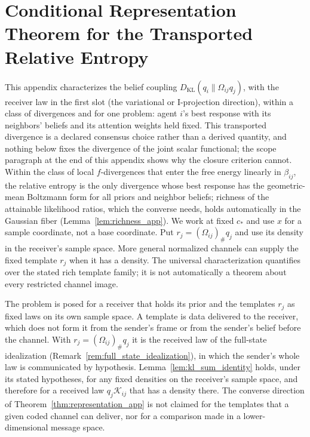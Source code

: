 \section{Conditional Representation Theorem for the Transported Relative Entropy}
\label{app:conditional_representation}

This appendix characterizes the belief coupling $D_{\mathrm{KL}}(q_i\|\Omega_{ij}q_j)$, with the receiver law in the first slot (the variational or I-projection direction), within a class of divergences and for one problem: agent $i$'s best response with its neighbors' beliefs and its attention weights held fixed. This transported divergence is a declared consensus choice rather than a derived quantity, and nothing below fixes the divergence of the joint scalar functional; the scope paragraph at the end of this appendix shows why the closure criterion cannot. Within the class of local $f$-divergences that enter the free energy linearly in $\beta_{ij}$, the relative entropy is the only divergence whose best response has the geometric-mean Boltzmann form for all priors and neighbor beliefs; richness of the attainable likelihood ratios, which the converse needs, holds automatically in the Gaussian fiber (Lemma~\ref{lem:richness_app}). We work at fixed $c_*$ and use $x$ for a sample coordinate, not a base coordinate. Put $r_j=(\Omega_{ij})_\#q_j$ and use its density in the receiver's sample space. More general normalized channels can supply the fixed template $r_j$ when it has a density. The universal characterization quantifies over the stated rich template family; it is not automatically a theorem about every restricted channel image.

The problem is posed for a receiver that holds its prior and the templates $r_j$ as fixed laws on its own sample space. A template is data delivered to the receiver, which does not form it from the sender's frame or from the sender's belief before the channel. With $r_j=(\Omega_{ij})_\#q_j$ it is the received law of the full-state idealization (Remark~\ref{rem:full_state_idealization}), in which the sender's whole law is communicated by hypothesis. Lemma~\ref{lem:kl_sum_identity} holds, under its stated hypotheses, for any fixed densities on the receiver's sample space, and therefore for a received law $q_j\mathcal K_{ij}$ that has a density there. The converse direction of Theorem~\ref{thm:representation_app} is not claimed for the templates that a given coded channel can deliver, nor for a comparison made in a lower-dimensional message space.

